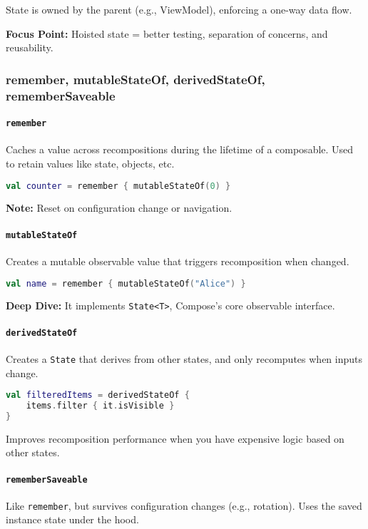 \documentclass[a4paper,12pt]{article}
\begin{document}
State is owned by the parent (e.g., ViewModel), enforcing a one-way data flow.

\textbf{Focus Point:} Hoisted state = better testing, separation of concerns, and reusability.

\subsubsection{remember, mutableStateOf, derivedStateOf, rememberSaveable}

\paragraph{\texttt{remember}}
Caches a value across recompositions during the lifetime of a composable. Used to retain values like state, objects, etc.

\begin{lstlisting}[language=Kotlin]
val counter = remember { mutableStateOf(0) }
\end{lstlisting}

\textbf{Note:} Reset on configuration change or navigation.

\paragraph{\texttt{mutableStateOf}}
Creates a mutable observable value that triggers recomposition when changed.

\begin{lstlisting}[language=Kotlin]
val name = remember { mutableStateOf("Alice") }
\end{lstlisting}

\textbf{Deep Dive:} It implements \texttt{State<T>}, Compose's core observable interface.

\paragraph{\texttt{derivedStateOf}}
Creates a \texttt{State} that derives from other states, and only recomputes when inputs change.

\begin{lstlisting}[language=Kotlin]
val filteredItems = derivedStateOf {
    items.filter { it.isVisible }
}
\end{lstlisting}

Improves recomposition performance when you have expensive logic based on other states.

\paragraph{\texttt{rememberSaveable}}
Like \texttt{remember}, but survives configuration changes (e.g., rotation). Uses the saved instance state under the hood.
\end{document}
